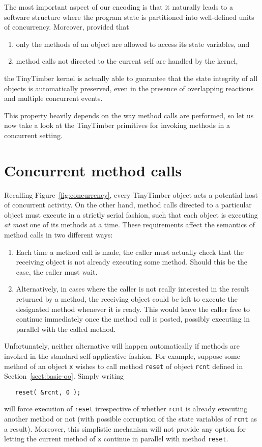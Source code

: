 \documentclass[12pt]{article}
\begin{document}
The most important aspect of our encoding is that it naturally leads to a software structure where the program state is partitioned into well-defined units of concurrency.  Moreover, provided that
\begin{enumerate}
\item only the methods of an object are allowed to access its state variables, and
\item method calls not directed to the current self are handled by the kernel,
\end{enumerate}
the TinyTimber kernel is actually able to guarantee that the state integrity of all objects is automatically preserved, even in the presence of overlapping reactions and multiple concurrent events.

This property heavily depends on the way method calls are performed, so let us now take a look at the TinyTimber primitives for invoking methods in a concurrent setting.

\section{Concurrent method calls}
\label{sect:primitives}

Recalling Figure~\ref{fig:concurrency}, every TinyTimber object acts a potential host of concurrent activity.  On the other hand, method calls directed to a particular object must execute in a strictly serial fashion, such that each object is executing {\em at most} one of its methods at a time.  These requirements affect the semantics of method calls in two different ways:
\begin{enumerate}
\item  Each time a method call is made, the caller must actually check that the receiving object is not already executing some method.  Should this be the case, the caller must wait.
\item  Alternatively, in cases where the caller is not really interested in the result returned by a method, the receiving object could be left to execute the designated method whenever it is ready.  This would leave the caller free to continue immediately once the method call is posted, possibly executing in parallel with the called method.
\end{enumerate}
Unfortunately, neither alternative will happen automatically if methods are invoked in the standard self-applicative fashion.  For example, suppose some method of an object {\tt x} wishes to call method {\tt reset} of object {\tt rcnt} defined in Section~\ref{sect:basic-oo}.  Simply writing
\begin{verbatim}
   reset( &rcnt, 0 );
\end{verbatim}
will force execution of {\tt reset} irrespective of whether {\tt rcnt} is already executing another method or not (with possible corruption of the state variables of {\tt rcnt} as a result).  Moreover, this simplistic mechanism will not provide any option for letting the current method of {\tt x} continue in parallel with method {\tt reset}.
\end{document}
